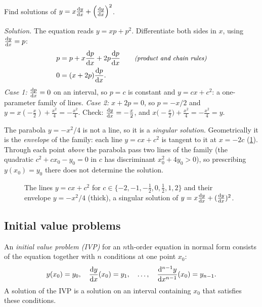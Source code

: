 \begin{example}\label{ex:ch01-clairaut}
Find solutions of $y = x\frac{\mathrm{d}y}{\mathrm{d}x} + \Bigl(\frac{\mathrm{d}y}{\mathrm{d}x}\Bigr)^2$.

\emph{Solution.}  The equation reads $y = xp + p^2$.
Differentiate both sides in $x$, using $\frac{\mathrm{d}y}{\mathrm{d}x} = p$:
\begin{align*}
  p &= p + x\frac{\mathrm{d}p}{\mathrm{d}x} + 2p\frac{\mathrm{d}p}{\mathrm{d}x} \qquad\text{\small\itshape(product and chain rules)}\\
  0 &= (x + 2p)\frac{\mathrm{d}p}{\mathrm{d}x} .
\end{align*}
\emph{Case 1:} $\frac{\mathrm{d}p}{\mathrm{d}x} = 0$ on an interval, so $p = c$ is constant and
$y = cx + c^2$: a one-parameter family of lines.
\emph{Case 2:} $x + 2p = 0$, so $p = -x/2$ and $y = x(-\tfrac{x}{2}) + \tfrac{x^2}{4}
= -\tfrac{x^2}{4}$. Check: $\frac{\mathrm{d}y}{\mathrm{d}x} = -\tfrac{x}{2}$, and
$x\bigl(-\tfrac x2\bigr) + \tfrac{x^2}{4} = -\tfrac{x^2}{4} = y$. \checkmark

The parabola $y = -x^2/4$ is not a line, so it is a \emph{singular solution}.
Geometrically it is the \emph{envelope} of the family: each line
$y = cx + c^2$ is tangent to it at $x = -2c$ (\cref{fig:ch01-clairaut}). Through
each point \emph{above} the parabola pass two lines of the family (the
quadratic $c^2 + cx_0 - y_0 = 0$ in $c$ has discriminant $x_0^2 + 4y_0 > 0$),
so prescribing $y(x_0) = y_0$ there does not determine the solution.
\end{example}

\begin{figure}[ht]
  \centering
  
  \caption{The lines $y = cx + c^2$ for $c\in\{-2,-1,-\tfrac12,0,\tfrac12,1,2\}$
  and their envelope $y = -x^2/4$ (thick), a singular solution of
  $y = x\frac{\mathrm{d}y}{\mathrm{d}x} + (\frac{\mathrm{d}y}{\mathrm{d}x})^2$.}
  \label{fig:ch01-clairaut}
\end{figure}

\subsection{Initial value problems}

\begin{definition}\label{def:ch01-ivp}
An \emph{initial value problem (IVP)} for an $n$th-order equation in normal
form consists of the equation together with $n$ conditions at one point
$x_0$:
\[
  y(x_0) = y_0,\quad \frac{\mathrm{d}y}{\mathrm{d}x}(x_0) = y_1,\quad\dots,\quad
  \frac{\mathrm{d}^{n-1}y}{\mathrm{d}x^{n-1}}(x_0) = y_{n-1}.
\]
A solution of the IVP is a solution on an interval containing $x_0$ that
satisfies these conditions.
\end{definition}

